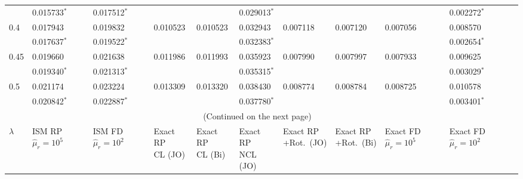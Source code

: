 \documentclass[../thesis.tex]{subfiles}
\begin{document}
\begin{landscape}
\begin{longtable}{lllllllllll}
 \\
 & 0.015733$^*$ & 0.017512$^*$ & & & 0.029013$^*$ & & & & 0.002272$^*$
 \\
 0.4 & 0.017943 & 0.019832 & 0.010523 & 0.010523 & 0.032943 & 0.007118 & 0.007120 & 0.007056 & 0.008570
 \\
 & 0.017637$^*$ & 0.019522$^*$ & & & 0.032383$^*$ & & & & 0.002654$^*$
 \\
 0.45 & 0.019660 & 0.021638 & 0.011986 & 0.011993 & 0.035923 & 0.007990 & 0.007997 & 0.007933 & 0.009625
 \\
 & 0.019340$^*$ & 0.021313$^*$ & & & 0.035315$^*$ & & & & 0.003029$^*$
 \\
 0.5 & 0.021174 & 0.023224 & 0.013309 & 0.013320 & 0.038430 & 0.008774 & 0.008784 & 0.008725 & 0.010578
 \\
  & 0.020842$^*$ & 0.022887$^*$ & & & 0.037780$^*$ & & & & 0.003401$^*$
  
 \\ \hline \multicolumn{10}{c}{(Continued on the next page)}
 \\ \newpage \hline $\lambda$ & \makecell[l]{ISM RP\\$\hat{\mu}_r=10^5$} & \makecell[l]{ISM FD\\$\hat{\mu}_r=10^2$} & \makecell[l]{Exact RP\\CL (JO)} & \makecell[l]{Exact RP\\CL (Bi)} & \makecell[l]{Exact RP\\NCL (JO)} & \makecell[l]{Exact RP\\+Rot.\ (JO)} & \makecell[l]{Exact RP\\+Rot.\ (Bi)} & \makecell[l]{Exact FD\\$\hat{\mu}_r=10^5$} & \makecell[l]{Exact FD\\$\hat{\mu}_r=10^2$}
 \\\hline


\end{longtable}
\end{landscape}
\end{document}

